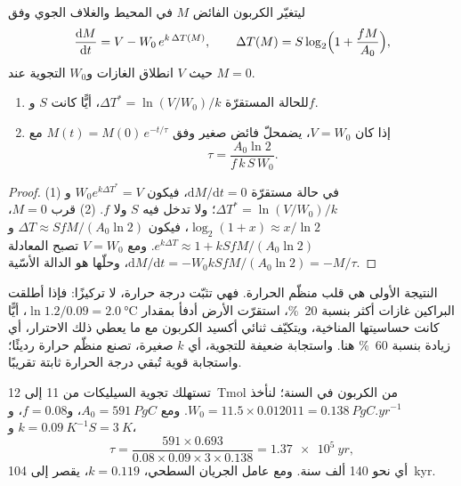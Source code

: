 \begin{proposition}\label{prop:b2:deep-time-climate:thermostat}
ليتغيّر الكربون الفائض $M$ في المحيط والغلاف الجوي وفق
\[
  \frac{\mathrm dM}{\mathrm dt} = V - W_0\,e^{k\,\Delta T(M)}, \qquad
  \Delta T(M) = S\log_2\Bigl(1 + \frac{fM}{A_0}\Bigr),
\]
حيث $V$ انطلاق الغازات و$W_0$ التجوية عند $M = 0$.
\begin{enumerate}
  \item للحالة المستقرّة $\Delta T^* = \ln(V/W_0)/k$، أيًّا كانت $S$ و$f$.
  \item إذا كان $V = W_0$، يضمحلّ فائض صغير وفق $M(t) = M(0)\,e^{-t/\tau}$ مع
        \[
          \tau = \frac{A_0 \ln 2}{f\,k\,S\,W_0} .
        \]
\end{enumerate}
\end{proposition}

\begin{proof}
(1) في حالة مستقرّة $\mathrm dM/\mathrm dt = 0$، فيكون $W_0e^{k\Delta T^*} = V$ و$\Delta T^* =
\ln(V/W_0)/k$؛ ولا تدخل فيه $S$ ولا $f$. (2) قرب $M = 0$، $\log_2(1 + x) \approx x/\ln 2$، فيكون
$\Delta T \approx SfM/(A_0\ln 2)$ و$e^{k\Delta T} \approx 1 + kSfM/(A_0\ln2)$. ومع $V = W_0$
تصبح المعادلة $\mathrm dM/\mathrm dt = -W_0kSfM/(A_0\ln 2) = -M/\tau$، وحلّها هو
الدالة الأسّية.
\end{proof}

النتيجة الأولى هي قلب منظّم الحرارة. فهي تثبّت درجة حرارة، لا تركيزًا: فإذا أطلقت
البراكين غازات أكثر بنسبة \qty{20}{\percent}، استقرّت الأرض أدفأ بمقدار $\ln 1.2/0.09 = \qty{2.0}{\celsius}$،
أيًّا كانت حساسيتها المناخية، ويتكيّف ثنائي أكسيد الكربون مع ما يعطي ذلك
الاحترار، أي زيادة بنسبة \qty{60}{\percent} هنا. واستجابة ضعيفة للتجوية، أي $k$ صغيرة، تصنع منظّم حرارة
رديئًا؛ واستجابة قوية تُبقي درجة الحرارة ثابتة تقريبًا.

\begin{example}\label{ex:b2:deep-time-climate:tau}
تستهلك تجوية السيليكات من 11 إلى \qty{12}{Tmol} من الكربون في السنة؛ لنأخذ $W_0 = 11.5\times0.012011
= \qty{0.138}{PgC.yr^{-1}}$. ومع $A_0 = \qty{591}{PgC}$، و$f = 0.08$، و$k = \qty{0.09}{K^{-1}}$
و$S = \qty{3}{K}$،
\[
  \tau = \frac{591\times0.693}{0.08\times0.09\times3\times0.138} = \qty{1.37e5}{yr} ,
\]
أي نحو 140 ألف سنة. ومع عامل الجريان السطحي، $k = 0.119$، يقصر إلى
\qty{104}{kyr}.
\end{example}


